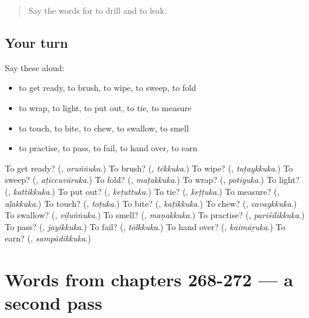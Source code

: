 \label{lesson:ML-R272-first-pass-words-from-chapters-264-267}



\begin{quote}
Say the words for to drill and to leak.
\end{quote}

\subsection*{Your turn}
Say these aloud:

\begin{itemize}
\raggedright
  \item to get ready, to brush, to wipe, to sweep, to fold
  \item to wrap, to light, to put out, to tie, to measure
  \item to touch, to bite, to chew, to swallow, to smell
  \item to practise, to pass, to fail, to hand over, to earn
\end{itemize}

\begin{tcolorbox}[breakable,colback=teal!4,colframe=teal!35!black,title={Before you move on}]
To get ready? (\textbf{}, \emph{oruṅṅuka}.) To brush? (\textbf{}, \emph{tēkkuka}.) To wipe? (\textbf{}, \emph{tuṭaykkuka}.) To sweep? (\textbf{}, \emph{aṭiccuvāruka}.) To fold? (\textbf{}, \emph{maṭakkuka}.) To wrap? (\textbf{}, \emph{potiyuka}.) To light? (\textbf{}, \emph{kattikkuka}.) To put out? (\textbf{}, \emph{keṭuttuka}.) To tie? (\textbf{}, \emph{keṭṭuka}.) To measure? (\textbf{}, \emph{aḷakkuka}.) To touch? (\textbf{}, \emph{toṭuka}.) To bite? (\textbf{}, \emph{kaṭikkuka}.) To chew? (\textbf{}, \emph{cavaykkuka}.) To swallow? (\textbf{}, \emph{viḻuṅṅuka}.) To smell? (\textbf{}, \emph{maṇakkuka}.) To practise? (\textbf{}, \emph{pariśīlikkuka}.) To pass? (\textbf{}, \emph{jayikkuka}.) To fail? (\textbf{}, \emph{tōlkkuka}.) To hand over? (\textbf{}, \emph{kaimāṟuka}.) To earn? (\textbf{}, \emph{sampādikkuka}.)
\end{tcolorbox}
\section[(dialogue)]{Words from chapters 268-272 — a second pass}


